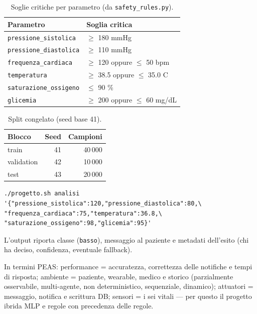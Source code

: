 \documentclass[11pt,a4paper]{article}
\newcommand{\codice}[1]{\texttt{#1}}
\newcommand{\file}[1]{\texttt{#1}}
\begin{document}
\begin{table}[htbp]
\centering
\caption{Soglie critiche per parametro (da \file{safety\_rules.py}).}
\label{tab:soglie}
\small
\begin{tabular}{ll}
\toprule
\textbf{Parametro} & \textbf{Soglia critica} \\
\midrule
\codice{pressione\_sistolica} & $\geq$ 180 mmHg \\
\codice{pressione\_diastolica} & $\geq$ 110 mmHg \\
\codice{frequenza\_cardiaca} & $\geq$ 120 oppure $\leq$ 50 bpm \\
\codice{temperatura} & $\geq$ 38.5 oppure $\leq$ 35.0 \textdegree{}C \\
\codice{saturazione\_ossigeno} & $\leq$ 90 \% \\
\codice{glicemia} & $\geq$ 200 oppure $\leq$ 60 mg/dL \\
\bottomrule
\end{tabular}
\end{table}

\begin{table}[htbp]
\centering
\caption{Split congelato (seed base 41).}
\label{tab:split}
\small
\begin{tabular}{lrr}
\toprule
\textbf{Blocco} & \textbf{Seed} & \textbf{Campioni} \\
\midrule
train & 41 & 40\,000 \\
validation & 42 & 10\,000 \\
test & 43 & 20\,000 \\
\bottomrule
\end{tabular}
\end{table}

\begin{lstlisting}[caption={Esempio di analisi di un paziente stabile.}]
./progetto.sh analisi '{"pressione_sistolica":120,"pressione_diastolica":80,\
"frequenza_cardiaca":75,"temperatura":36.8,\
"saturazione_ossigeno":98,"glicemia":95}'
\end{lstlisting}
L'output riporta classe (\codice{basso}), messaggio al paziente e metadati
dell'esito (chi ha deciso, confidenza, eventuale fallback).

In termini PEAS: performance = accuratezza, correttezza delle notifiche e
tempi di risposta; ambiente = paziente, wearable, medico e storico
(parzialmente osservabile, multi-agente, non deterministico, sequenziale,
dinamico); attuatori = messaggio, notifica e scrittura DB; sensori = i sei
vitali --- per questo il progetto ibrida MLP e regole con precedenza delle
regole.
\end{document}
